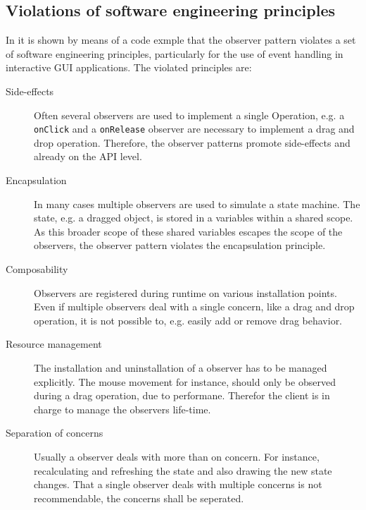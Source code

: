 \documentclass[acmsmall]{acmart}\settopmatter{printfolios=true,printccs=false,printacmref=false}
\begin{document}
	\subsection{Violations of software engineering principles}
		In \cite{Maier:2012} it is shown by means of a code exmple that the observer pattern violates a set of software engineering principles,
		particularly for the use of event handling in interactive GUI applications.
		The violated principles are:
		\begin{description}
			\item[Side-effects]
			Often several observers are used to implement a single Operation,
			e.g. a \lstinline|onClick| and a \lstinline|onRelease| observer are necessary to implement a drag and drop operation.
			Therefore, the observer patterns promote side-effects and already on the API level.
			
			\item[Encapsulation]
			In many cases multiple observers are used to simulate a state machine. 
			The state, e.g. a dragged object, is stored in a variables within a shared scope.
			As this broader scope of these shared variables escapes the scope of the observers, the observer pattern violates the encapsulation principle.
			
			\item[Composability]
			Observers are registered during runtime on various installation points.
			Even if multiple observers deal with a single concern, like a drag and drop operation, it is not possible to, e.g. easily add or remove drag behavior.
			
			\item[Resource management]
			The installation and uninstallation of a observer has to be managed explicitly.
			The mouse movement for instance, should only be observed during a drag operation, due to performane. 
			Therefor the client is in charge to manage the observers life-time.
			
			\item[Separation of concerns]
			Usually a observer deals with more than on concern. For instance, recalculating and refreshing the state and also drawing the new state changes.
			That a single observer deals with multiple concerns is not recommendable, the concerns shall be seperated.


\end{description}
\end{document}
